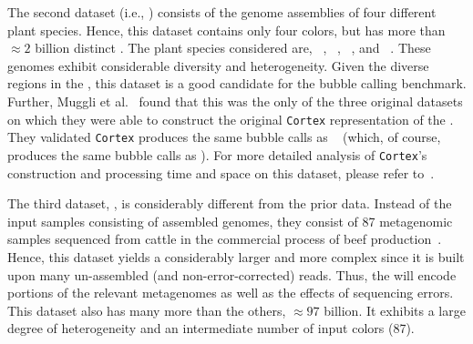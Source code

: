 The second dataset (i.e., \plant) consists of the genome assemblies of four
different plant species. Hence, this dataset contains only four colors, but has
more than $\approx2$ billion distinct \kmers. The plant species considered are,
~\cite{swarbreck2008arabidopsis},
~\cite{schnable2009b73},
~\cite{tanaka2008rice},
and
~\cite{causse2013whole}.
%
These genomes exhibit considerable diversity and heterogeneity. Given the
diverse regions in the \cdbg, this dataset is a good candidate for the bubble
calling benchmark. Further, Muggli et al.~\cite{MuggliBoNo17} found that this
was the only of the three original datasets on which they were able to construct
the original \texttt{Cortex} representation of the \cdbg. They validated
\texttt{Cortex} produces the same bubble calls as \vari ~\cite{MuggliBoNo17}
(which, of course, produces the same bubble calls as \system).
%
For more detailed analysis of \texttt{Cortex}'s construction and processing time
and space on this dataset, please refer to~\cite{MuggliBoNo17}.
%
%

The third dataset, \beefsafety, is considerably different from the prior data.
Instead of the input samples consisting of assembled genomes, they consist of
87 metagenomic samples sequenced from cattle in the commercial process of beef
production~\cite{noyes2016resistome}. Hence, this dataset yields a considerably
larger and more complex \dbg since it is built upon many un-assembled (and
non-error-corrected) reads. Thus, the \dbg will encode portions of the relevant
metagenomes as well as the effects of sequencing errors. This dataset also has
many more \kmers than the others, $\approx97$ billion. It exhibits a large
degree of heterogeneity and an intermediate number of input colors (87).
%
%


